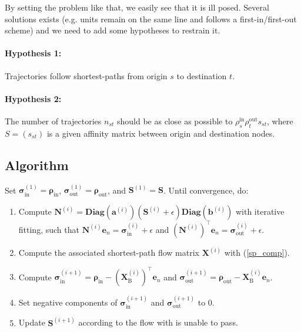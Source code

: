 \documentclass[11p]{article}
\begin{document}
By setting the problem like that, we easily see that it is ill posed. Several solutions exists (e.g. units remain on the same line and follows a first-in/first-out scheme) and we need to add some hypotheses to restrain it.

\paragraph{Hypothesis 1:} Trajectories follow shortest-paths from origin $s$ to destination $t$. \\

\paragraph{Hypothesis 2:} The number of trajectories $n_{st}$ should be as close as possible to $\rho^\text{in}_s \rho^\text{out}_t s_{st}$, where $S = (s_{st})$ is a given affinity matrix between origin and destination nodes. \\

\subsection{Algorithm}
Set $\bm{\sigma}^{(1)}_\text{in} = \bm{\rho}_\text{in}$, $\bm{\sigma}^{(1)}_\text{out} = \bm{\rho}_\text{out}$, and $\mathbf{S}^{(1)} = \mathbf{S}$. Until convergence, do:
\begin{enumerate}
	\item Compute $\mathbf{N}^{(i)} = \textbf{Diag}(\mathbf{a}^{(i)}) (\mathbf{S}^{(i)} + \epsilon)\textbf{Diag}(\mathbf{b}^{(i)})$ with iterative fitting, such that $\mathbf{N}^{(i)} \mathbf{e}_n = \bm{\sigma}^{(i)}_\text{in} + \epsilon$ and $\left(\mathbf{N}^{(i)}\right)^\top \mathbf{e}_n = \bm{\sigma}^{(i)}_\text{out}  + \epsilon$.
	\item Compute the associated shortest-path flow matrix $\mathbf{X}^{(i)}$ with (\ref{sp_comp}).
	\item Compute $\bm{\sigma}^{(i+1)}_\text{in} = \bm{\rho}_\text{in} -  (\mathbf{X}^{(i)}_\text{B})^\top \mathbf{e}_n$ and $\bm{\sigma}^{(i+1)}_\text{out} = \bm{\rho}_\text{out} - \mathbf{X}^{(i)}_\text{B} \mathbf{e}_n$. 
	\item Set negative components of $\bm{\sigma}^{(i+1)}_\text{in}$ and $\bm{\sigma}^{(i+1)}_\text{out}$ to 0.
	\item Update $\mathbf{S}^{(i + 1)}$ according to the flow with is unable to pass.
\end{enumerate}
\end{document}
